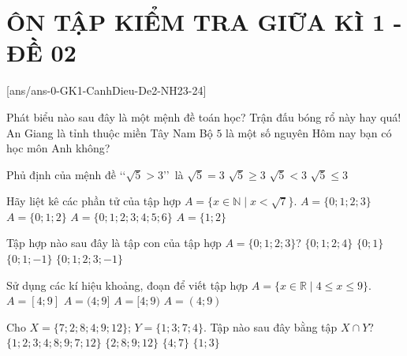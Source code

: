 \section*{ÔN TẬP KIỂM TRA GIỮA KÌ 1 - ĐỀ 02}
\setcounter{ex}{0}\setcounter{bt}{0}
[ans/ans-0-GK1-CanhDieu-De2-NH23-24]
\begin{ex}%
Phát biểu nào sau đây là một mệnh đề toán học?
\choice
{Trận đấu bóng rổ này hay quá!}
{An Giang là tỉnh thuộc miền Tây Nam Bộ}
{\True $5$ là một số nguyên}
{Hôm nay bạn có học môn Anh không?}
\end{ex}
\begin{ex}%
Phủ định của mệnh đề \lq\lq$\sqrt{5}>3$\rq\rq\, là
\choice
{$\sqrt{5}=3$}
{$\sqrt{5} \geq 3$}
{$\sqrt{5}<3$}
{\True $\sqrt{5} \leq 3$}
\end{ex}
\begin{ex}%
Hãy liệt kê các phần tử của tập hợp $A=\{x \in \mathbb{N} \mid x<\sqrt{7}\}$.
\choice
{$A=\{0 ; 1 ; 2 ; 3\}$}
{\True $A=\{0 ; 1 ; 2\}$}
{$A=\{0 ; 1 ; 2 ; 3 ; 4 ; 5 ; 6\}$}
{$A=\{1 ; 2\}$}
\end{ex}
\begin{ex}%
Tập hợp nào sau đây là tập con của tập hợp $A=\{0; 1; 2; 3\}$?
\choice
{$\{0; 1; 2; 4\}$}
{\True $\{0; 1\}$}
{$\{0; 1;-1\}$}
{$\{0; 1; 2; 3;-1\}$}
\end{ex}
\begin{ex}%
Sử dụng các kí hiệu khoảng, đoạn để viết tập hợp $A=\{x \in \mathbb{R} \mid 4 \leq x \leq 9\}$.
\choice
{\True $A=[4; 9]$}
{$A=(4; 9]$}
{$A=[4; 9)$}
{$A=(4; 9)$}
\end{ex}
\begin{ex}%
Cho $X=\{7; 2; 8; 4; 9; 12\}$; $Y=\{1; 3; 7; 4\}$. Tập nào sau đây bằng tập $X\cap Y$?
\choice
{$\{1; 2; 3; 4; 8; 9; 7; 12\}$}
{$\{2; 8; 9; 12\}$}
{\True $\{4; 7\}$}
{$\{1; 3\}$}
\end{ex}
